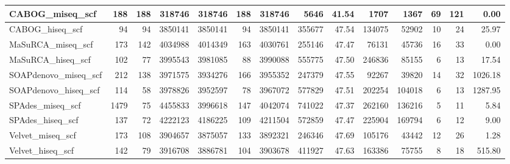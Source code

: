 \documentclass[12pt,a4paper]{article}
\begin{document}
\begin{table}[ht]
\begin{center}
\begin{tabular}{|l*{13}{|r}|}
CABOG\_miseq\_scf & 188 & 188 & 318746 & 318746 & 188 & 318746 & 5646 & 41.54 & 1707 & 1367 & 69 & 121 & 0.00 \\ \hline
CABOG\_hiseq\_scf & 94 & 94 & 3850141 & 3850141 & 94 & 3850141 & 355677 & 47.54 & 134075 & 52902 & 10 & 24 & 25.97 \\ \hline
MaSuRCA\_miseq\_scf & 173 & 142 & 4034988 & 4014349 & 163 & 4030761 & 255146 & 47.47 & 76131 & 45736 & 16 & 33 & 0.00 \\ \hline
MaSuRCA\_hiseq\_scf & 102 & 77 & 3995543 & 3981085 & 88 & 3990088 & 555775 & 47.50 & 246836 & 85155 & 6 & 13 & 17.54 \\ \hline
SOAPdenovo\_miseq\_scf & 212 & 138 & 3971575 & 3934276 & 166 & 3955352 & 247379 & 47.55 & 92267 & 39820 & 14 & 32 & 1026.18 \\ \hline
SOAPdenovo\_hiseq\_scf & 114 & 58 & 3978826 & 3952597 & 78 & 3967072 & 577829 & 47.51 & 202254 & 104018 & 6 & 13 & 1287.95 \\ \hline
SPAdes\_miseq\_scf & 1479 & 75 & 4455833 & 3996618 & 147 & 4042074 & 741022 & 47.37 & 262160 & 136216 & 5 & 11 & 5.84 \\ \hline
SPAdes\_hiseq\_scf & 137 & 72 & 4222123 & 4186225 & 109 & 4211504 & 572859 & 47.47 & 225904 & 169794 & 6 & 12 & 9.00 \\ \hline
Velvet\_miseq\_scf & 173 & 108 & 3904657 & 3875057 & 133 & 3892321 & 246346 & 47.69 & 105176 & 43442 & 12 & 26 & 1.28 \\ \hline
Velvet\_hiseq\_scf & 142 & 79 & 3916708 & 3886781 & 104 & 3903678 & 411927 & 47.63 & 163386 & 75755 & 8 & 18 & 515.80 \\ \hline
\end{tabular}
\end{center}
\end{table}
\end{document}
